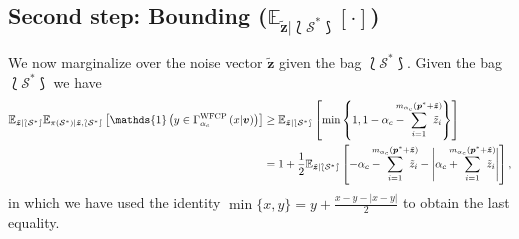 \documentclass[12pt, draftclsnofoot, onecolumn]{IEEEtran}
\begin{document}
\subsection*{\textbf{Second step: Bounding ($\mathbb{E}_{\tilde{\boldsymbol{z}}|\lbag \mathcal{S}^* \rbag}[\cdot]$)}}
We now marginalize over the noise vector $\tilde{\boldsymbol{z}}$ given the bag $\lbag\mathcal{S}^*\rbag$. Given the bag $\lbag\mathcal{S}^*\rbag$ we have
\begin{align}\label{LB}
    \mathbb{E}_{\tilde{\boldsymbol{z}}| \lbag\mathcal{S}^*\rbag}\mathbb{E}_{\pi(\mathcal{S}^*)|\tilde{\boldsymbol{z}},\lbag\mathcal{S}^*\rbag}\left[\mathds{1}\left(y \in \Gamma_{\alpha_c}^{\text{\rm{WFCP}}}\left(x|\boldsymbol{v}\right)\right)\right]&\geq \mathbb{E}_{\tilde{\boldsymbol{z}}|\lbag\mathcal{S}^*\rbag}\left[\min \left\{1,1-\alpha_c -\hspace{-1em}\sum^{m_{\alpha_c}(\boldsymbol{p}^*+\tilde{\boldsymbol{z}})}_{i=1}\hspace{-1em}\tilde{z}_i\right\}\right]\nonumber \\
    &= 1+\frac{1}{2}\mathbb{E}_{\tilde{\boldsymbol{z}}|\lbag\mathcal{S}^*\rbag}\left[-\alpha_c - \hspace{-1em} \sum^{m_{\alpha_c}(\boldsymbol{p}^*+\tilde{\boldsymbol{z}})}_{i=1}\hspace{-1em}\tilde{z}_i-\Bigg|\alpha_c +\hspace{-1em} \sum^{m_{\alpha_c}(\boldsymbol{p}^* + \tilde{\boldsymbol{z}})}_{i=1}\hspace{-1em}\tilde{z}_i\Bigg|\right],
\end{align}
in which we have used the identity $\min\{x,y\}=y+\frac{x-y-|x-y|}{2}$ to obtain the last equality.
\end{document}
